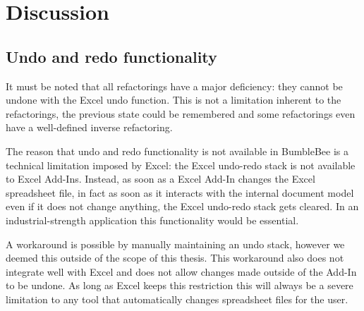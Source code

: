 %
%
%
%

\newpage

\section{Discussion}

\subsection{Undo and redo functionality}

It must be noted that all refactorings have a major deficiency: they cannot be undone with the Excel undo function.
This is not a limitation inherent to the refactorings, the previous state could be remembered and some refactorings even have a well-defined inverse refactoring.

The reason that undo and redo functionality is not available in BumbleBee is a technical limitation imposed by Excel: the Excel undo-redo stack is not available to Excel Add-Ins.
Instead, as soon as a Excel Add-In changes the Excel spreadsheet file, in fact as soon as it interacts with the internal document model even if it does not change anything, the Excel undo-redo stack gets cleared.
In an industrial-strength application this functionality would be essential.

A workaround is possible by manually maintaining an undo stack, however we deemed this outside of the scope of this thesis.
This workaround also does not integrate well with Excel and does not allow changes made outside of the Add-In to be undone. 
As long as Excel keeps this restriction this will always be a severe limitation to any tool that automatically changes spreadsheet files for the user.

